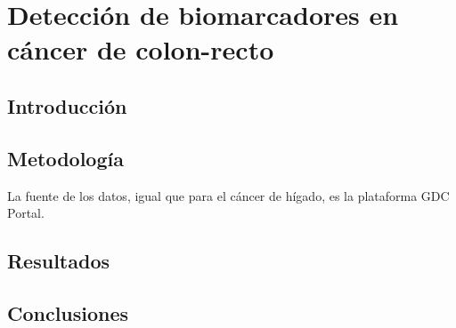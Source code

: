 \chapter{Detección de biomarcadores en cáncer de colon-recto}

\section{Introducción}

\section{Metodología}

La fuente de los datos, igual que para el cáncer de hígado, es la plataforma GDC Portal.

\section{Resultados}


\section{Conclusiones}

